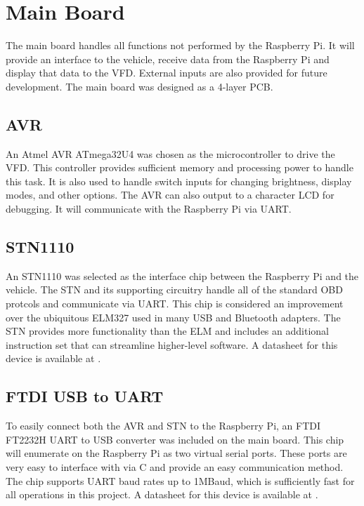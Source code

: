\section{Main Board}
The main board handles all functions not performed by the Raspberry Pi.  It will
provide an interface to the vehicle, receive data from the Raspberry Pi and 
display that data to the VFD.  External inputs are also provided for future 
development.  The main board was designed as a 4-layer PCB.

\subsection{AVR}
An Atmel AVR ATmega32U4 \cite{atmega32u4ds} was chosen as the microcontroller to drive the VFD.  This
controller provides sufficient memory and processing power to handle this task. 
It is also used to handle switch inputs for changing brightness, display modes,
and other options.  The AVR can also output to a character LCD
for debugging.  It will communicate with the Raspberry Pi via UART.

\subsection{STN1110}
An STN1110 was selected as the interface chip between the Raspberry Pi and the 
vehicle.  The STN and its supporting circuitry handle all of the standard OBD
protcols and communicate via UART.  This chip is considered an improvement over
the ubiquitous ELM327 used in many USB and Bluetooth adapters.  The STN provides
more functionality than the ELM and includes an additional instruction set that
can streamline higher-level software. A datasheet for this device is available
at \cite{stn1110ds}.

\subsection{FTDI USB to UART}
To easily connect both the AVR and STN to the Raspberry Pi, an FTDI FT2232H UART 
to USB converter was included on the main board.  This chip will enumerate on the
Raspberry Pi as two virtual serial ports.  These ports are very easy to interface
with via C and provide an easy communication method.  The chip supports UART baud
rates up to 1MBaud, which is sufficiently fast for all operations in this project.
A datasheet for this device is available at \cite{ft2232hds}.

